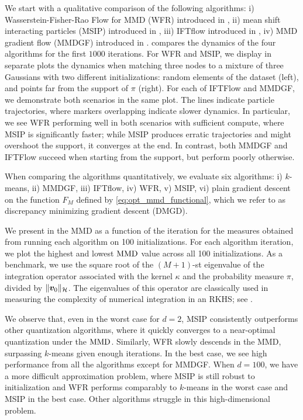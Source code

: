     



We start with a qualitative comparison of the following algorithms: i) Wasserstein-Fisher-Rao Flow for MMD (WFR) introduced in , ii) mean shift interacting particles (MSIP) introduced in , iii) IFTflow introduced in \cite{GlDvMiZh24}, iv) MMD gradient flow (MMDGF) introduced in \cite{ArKoSaGr19}.  compares the dynamics of the four algorithms for the first $1000$ iterations. 
For WFR and MSIP, we display in separate plots the dynamics when matching three nodes to a mixture of three Gaussians with two different initializations: random elements of the dataset (left), and points far from the support of $\pi$ (right). For each of IFTFlow and MMDGF, we demonstrate both scenarios in the same plot. The lines indicate particle trajectories, where markers overlapping indicate slower dynamics. In particular, we see WFR performing well in both scenarios with sufficient compute, where MSIP is significantly faster; 
while MSIP produces erratic trajectories and might overshoot the support, it converges at the end.
In contrast, both MMDGF and IFTFlow succeed when starting from the support, but perform poorly otherwise.


When comparing the algorithms quantitatively, we evaluate six algorithms: i) $k$-means, ii) MMDGF, iii) IFTflow, iv) WFR, v) MSIP, vi) plain gradient descent on the function $F_{M}$ defined by \eqref{eq:opt_mmd_functional}, which we refer to as discrepancy minimizing gradient descent (DMGD). 

We present in  the MMD as a function of the iteration for the measures obtained from running each algorithm on 100 initializations. %
For each algorithm iteration, we plot the highest and lowest $\operatorname{MMD}$ value across all 100 initializations. As a benchmark, we use the square root of the $(M+1)$-st eigenvalue of the integration operator associated with the kernel $\kappa$ and the probability measure $\pi$, divided by $\|\bm{v}_{0}\|_{\mathcal{H}}$. The eigenvalues of this operator are classically used in measuring the complexity of numerical integration in an RKHS; see \cite{Pin12,Bac17}.




We observe that, even in the worst case for $d=2$, MSIP consistently outperforms other quantization algorithms, where it quickly converges to a near-optimal quantization under the $\operatorname{MMD}$. Similarly, WFR slowly descends in the MMD, surpassing $k$-means given enough iterations. In the best case, we see high performance from all the algorithms except for MMDGF. When $d=100$, we have a more difficult approximation problem, where MSIP is still robust to initialization and WFR performs comparably to $k$-means in the worst case and MSIP in the best case. Other algorithms struggle in this high-dimensional problem.



